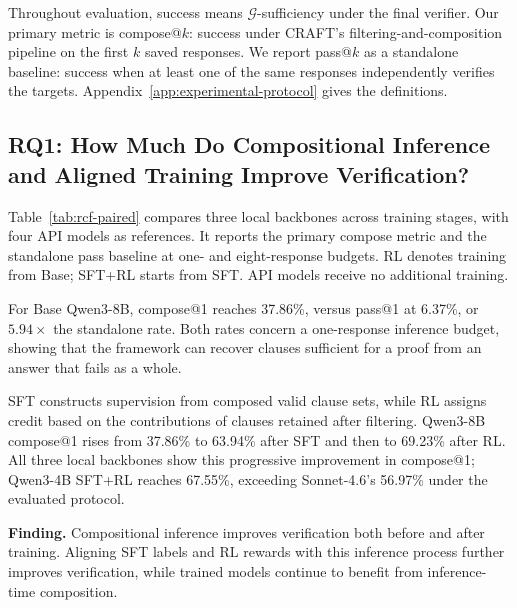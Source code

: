 Throughout evaluation, success means \(\mathcal G\)-sufficiency under the final
verifier. Our primary metric is compose@\(k\): success under CRAFT's
filtering-and-composition pipeline on the first \(k\) saved responses. We report pass@\(k\)
as a standalone baseline: success when at least one of the same responses
independently verifies the targets. Appendix~\ref{app:experimental-protocol}
gives the definitions.


\subsection{RQ1: How Much Do Compositional Inference and Aligned Training Improve Verification?}
\label{sec:exp:main}

Table~\ref{tab:rcf-paired} compares three local backbones across training
stages, with four API models as references. It reports the primary compose
metric and the standalone pass baseline at one- and eight-response budgets.
RL denotes training from Base;
SFT+RL starts from SFT. API models receive no additional training.



For Base Qwen3-8B, compose@1 reaches 37.86\%, versus pass@1 at 6.37\%,
or \(5.94\times\) the standalone rate.
Both rates concern a one-response inference budget, showing that the framework can recover
clauses sufficient for a proof from an answer that fails as a whole.

SFT constructs supervision from composed valid clause sets, while RL assigns
credit based on the contributions of clauses retained after filtering.
Qwen3-8B compose@1 rises from 37.86\% to 63.94\% after SFT and then to
69.23\% after RL.  All three local backbones show this progressive
improvement in compose@1; Qwen3-4B SFT+RL reaches 67.55\%, exceeding
Sonnet-4.6's 56.97\% under the evaluated protocol.

\begin{insightbox}
\textbf{Finding.}
Compositional inference improves verification both before and after training.
Aligning SFT labels and RL rewards with this inference process further improves
verification, while trained models continue to benefit from inference-time
composition.
\end{insightbox}

